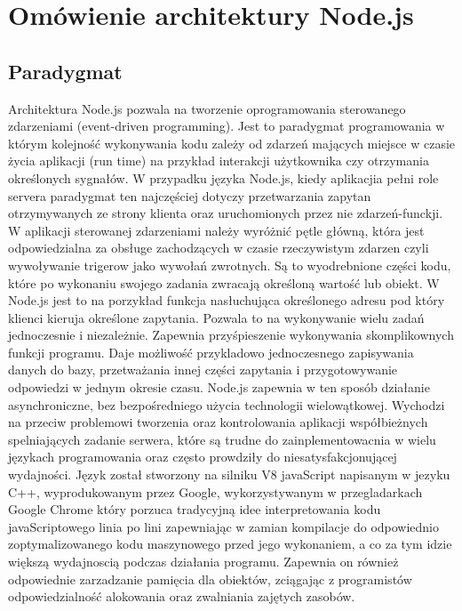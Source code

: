 \documentclass[12pt]{report}
\begin{document}
\chapter{Omówienie architektury Node.js}

\section{Paradygmat}
Architektura Node.js pozwala na tworzenie oprogramowania sterowanego zdarzeniami (event-driven programming). 
Jest to paradygmat programowania w którym kolejność wykonywania kodu zależy od zdarzeń mających miejsce w czasie życia aplikacji (run time) na przykład interakcji użytkownika czy otrzymania określonych sygnałów. 
W przypadku języka Node.js, kiedy aplikacjia pełni role servera paradygmat ten najczęściej dotyczy przetwarzania zapytan otrzymywanych ze strony klienta oraz uruchomionych przez nie zdarzeń-funckji. 
W aplikacji sterowanej zdarzeniami należy wyróżnić pętle główną, która jest odpowiedzialna za obsługe zachodzących w czasie rzeczywistym zdarzen czyli wywoływanie trigerow jako wywołań zwrotnych. 
Są to wyodrebnione części kodu, które po wykonaniu swojego zadania zwracają określoną wartość lub obiekt. 
W Node.js jest to na porzykład funkcja nasłuchująca określonego adresu pod który klienci kieruja określone zapytania. 
Pozwala to na wykonywanie wielu zadań jednoczesnie i niezależnie. 
Zapewnia przyśpieszenie wykonywania skomplikownych funkcji programu. 
Daje możliwość przykladowo jednoczesnego zapisywania danych do bazy, przetważania innej części zapytania i przygotowywanie odpowiedzi w jednym okresie czasu. 
Node.js zapewnia w ten sposób działanie asynchroniczne, bez bezpośredniego użycia technologii wielowątkowej. 
Wychodzi na przeciw problemowi tworzenia oraz kontrolowania aplikacji współbieżnych spelniających zadanie serwera, które są trudne do zainplementowacnia w wielu językach programowania oraz często prowdziły do niesatysfakcjonującej wydajności. 
Język został stworzony na silniku V8 javaScript napisanym w jezyku C++, wyprodukowanym przez Google, wykorzystywanym w przegladarkach Google Chrome który porzuca tradycyjną idee interpretowania kodu javaScriptowego linia po lini zapewniając w zamian kompilacje do odpowiednio zoptymalizowanego kodu maszynowego przed jego wykonaniem, a co za tym idzie większą wydajnoscią podczas działania programu. 
Zapewnia on również odpowiednie zarzadzanie pamięcia dla obiektów, zciągając z programistów odpowiedzialność alokowania oraz zwalniania zajętych zasobów.
\end{document}
